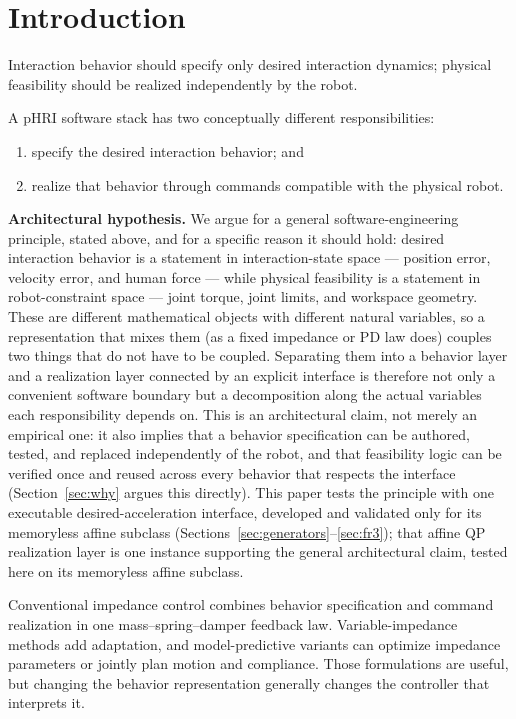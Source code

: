 \documentclass[journal]{IEEEtran}
\begin{document}
\section{Introduction}
\label{sec:intro}

Interaction behavior should specify only desired interaction dynamics;
physical feasibility should be realized independently by the robot.

A pHRI software stack has two conceptually different responsibilities:
\begin{enumerate}
\item specify the desired interaction behavior; and
\item realize that behavior through commands compatible with the physical
robot.
\end{enumerate}

\noindent\textbf{Architectural hypothesis.} We argue for a general
software-engineering principle, stated above, and for a specific reason
it should hold: desired interaction behavior is a statement in
interaction-state space --- position error, velocity error, and human
force --- while physical feasibility is a statement in robot-constraint
space --- joint torque, joint limits, and workspace geometry. These are
different mathematical objects with different natural variables, so a
representation that mixes them (as a fixed impedance or PD law does)
couples two things that do not have to be coupled. Separating them into a
behavior layer and a realization layer connected by an explicit interface
is therefore not only a convenient software boundary but a decomposition
along the actual variables each responsibility depends on. This is an
architectural claim, not merely an empirical one: it also implies that a
behavior specification can be authored, tested, and replaced
independently of the robot, and that feasibility logic can be verified
once and reused across every behavior that respects the interface
(Section~\ref{sec:why} argues this directly). This paper tests the
principle with one executable desired-acceleration interface, developed
and validated only for its memoryless affine subclass
(Sections~\ref{sec:generators}--\ref{sec:fr3}); that affine QP realization
layer is one instance supporting the general architectural claim, tested
here on its memoryless affine subclass.

Conventional impedance control combines behavior specification and
command realization in one mass--spring--damper feedback law.
Variable-impedance methods add adaptation, and model-predictive variants
can optimize impedance parameters or jointly plan motion and compliance.
Those formulations are useful, but changing the behavior representation
generally changes the controller that interprets it.
\end{document}
